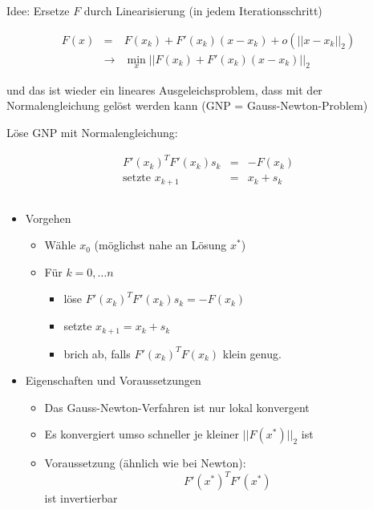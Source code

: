 \documentclass[10pt,a4paper]{article}
\begin{document}
\begin{bsp}

Idee: Ersetze $F$ durch Linearisierung (in jedem Iterationsschritt)

\begin{eqnarray*}
F(x)&=&F(x_k)+F'(x_k)(x-x_k) + o(||x-x_k||_{2}) \\
& \rightarrow & \min\limits_x ||F(x_k)+F'(x_k)(x-x_k)||_2
\end{eqnarray*}



und das ist wieder ein lineares Ausgeleichsproblem, dass mit der  Normalengleichung gelöst werden kann (GNP = Gauss-Newton-Problem)

Löse GNP mit Normalengleichung: 

\begin{eqnarray*}
F'(x_k)^{T}F'(x_k)s_k&=&-F(x_k) \\
 \text{setzte } x_{k+1}&=&x_k+s_k
\end{eqnarray*}


\end{bsp}

\begin{bsp}

$$ $$

\begin{itemize}
	\item Vorgehen
	\begin{itemize}
		\item Wähle $x_0$ (möglichst nahe an Lösung $x^{*}$)
		\item Für $k=0, \ldots n$
		\begin{itemize} 
			\item löse $F'(x_k)^{T}F'(x_k)s_k=-F(x_k)$
			\item setzte $x_{k+1}=x_k+s_k$ 
			\item brich ab, falls $F'(x_k)^{T}F(x_k)$ klein genug.
		\end{itemize}
	\end{itemize}
	\item Eigenschaften und Voraussetzungen
	\begin{itemize}
		\item Das Gauss-Newton-Verfahren ist nur lokal konvergent
		\item Es konvergiert umso schneller je kleiner $||F(x^{*})||_2$ ist
		\item Voraussetzung (ähnlich wie bei Newton): $$F'(x^{*})^{T}F'(x^{*})$$ ist invertierbar
	\end{itemize}
	\end{itemize}
\end{bsp}
\end{document}
